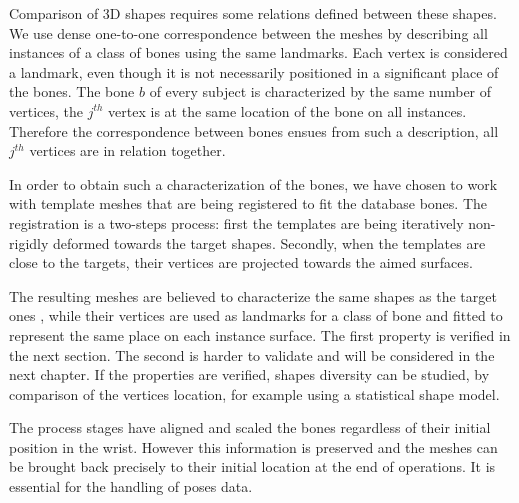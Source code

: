 Comparison of 3D shapes requires some relations defined between these shapes. We use dense one-to-one correspondence between the meshes by describing all instances of a class of bones using the same landmarks. Each vertex is considered a landmark, even though it is not necessarily positioned in a significant place of the bones. The bone $b$ of every subject is characterized by the same number of vertices, the $j^{th}$ vertex is at the same location of the bone on all instances. Therefore the correspondence between bones ensues from such a description, all $j^{th}$ vertices are in relation together. 

In order to obtain such a characterization of the bones, we have chosen to work with template meshes that are being registered to fit the database bones. The registration is a two-steps process: first the templates are being iteratively non-rigidly deformed towards the target shapes. Secondly, when the templates are close to the targets, their vertices are projected towards the aimed surfaces. 

The resulting meshes \mw* are believed to characterize the same shapes as the target ones \mr*, while their vertices are used as landmarks for a class of bone and fitted to represent the same place on each instance surface. The first property is verified in the next section. The second is harder to validate and will be considered in the next chapter. If the properties are verified, shapes diversity can be studied, by comparison of the vertices location, for example using a statistical shape model. 

The process stages have aligned and scaled the bones regardless of their initial position in the wrist. However this information is preserved and the meshes can be brought back precisely to their initial location at the end of operations. It is essential for the handling of poses data. 
